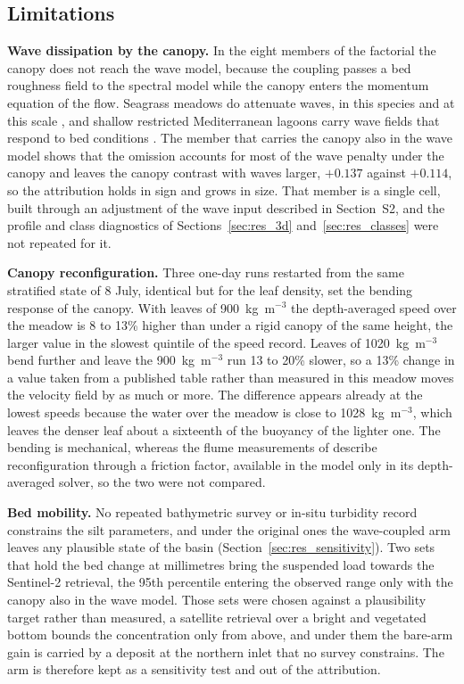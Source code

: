\subsection{Limitations}
\label{sec:disc_limits}

\textbf{Wave dissipation by the canopy.} In the eight members of the factorial
the canopy does not reach the wave model, because the coupling passes a bed
roughness field to the spectral model while the canopy enters the momentum
equation of the flow. Seagrass meadows do attenuate waves, in this
species and at this scale \citep{Infantes2012, Prinos2010}, and shallow
restricted Mediterranean lagoons carry wave fields that respond to bed
conditions \citep{Morote2025}. The member that carries the canopy also in the
wave model shows that the omission accounts for most of the wave penalty under
the canopy and leaves the canopy contrast with waves larger, $+0.137$ against
$+0.114$, so the attribution holds in sign and grows in size. That member is a
single cell, built through an adjustment of the wave input described in
Section~S2, and the profile and class diagnostics of
Sections~\ref{sec:res_3d} and~\ref{sec:res_classes} were not repeated for it.

\textbf{Canopy reconfiguration.} Three one-day runs restarted from the same
stratified state of 8 July, identical but for the leaf density, set the bending
response of the canopy. With leaves of 900~kg~m$^{-3}$ the depth-averaged speed
over the meadow is 8 to 13\% higher than under a rigid canopy of the same
height, the larger value in the slowest quintile of the speed record. Leaves of
1020~kg~m$^{-3}$ bend further and leave the 900~kg~m$^{-3}$ run 13 to 20\%
slower, so a 13\% change in a value taken from a published table rather than
measured in this meadow moves the velocity field by as much or more. The
difference appears already at the lowest speeds because the water over the
meadow is close to 1028~kg~m$^{-3}$, which leaves the denser leaf about a
sixteenth of the buoyancy of the lighter one. The bending is mechanical,
whereas the flume measurements of \citet{CiraoloFerreri2006} describe
reconfiguration through a friction factor, available in the model only in its
depth-averaged solver, so the two were not compared.

\textbf{Bed mobility.} No repeated bathymetric survey or in-situ turbidity
record constrains the silt parameters, and under the original ones the
wave-coupled arm leaves any plausible state of the basin
(Section~\ref{sec:res_sensitivity}). Two sets that hold the
bed change at millimetres bring the suspended load towards the Sentinel-2
retrieval, the 95th percentile entering the observed range only with the canopy
also in the wave model. Those sets were chosen against a plausibility target
rather than measured, a satellite retrieval over a bright and vegetated bottom
bounds the concentration only from above, and under them the bare-arm gain is
carried by a deposit at the northern inlet that no survey constrains. The arm
is therefore kept
as a sensitivity test and out of the attribution.

